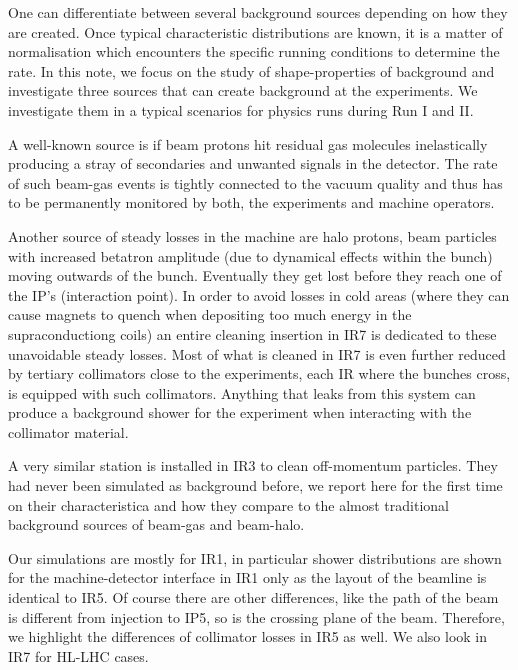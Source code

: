 One can differentiate between several background sources depending on how they are created. Once typical characteristic distributions are known, it is a matter of normalisation which encounters the specific running conditions to determine the rate. In this note, we focus on the study of shape-properties of background and investigate three sources that can create background at the experiments. We investigate them in a typical scenarios for physics runs during Run I and II.

A well-known source is if beam protons hit residual gas molecules inelastically producing a stray of secondaries and unwanted signals in the detector. The rate of such beam-gas events is tightly connected to the vacuum quality and thus has to be permanently monitored by both, the experiments and machine operators.

Another source of steady losses in the machine are halo protons, beam particles with increased betatron amplitude (due to dynamical effects within the bunch) moving outwards of the bunch. Eventually they get lost before they reach one of the IP's (interaction point). In order to avoid losses in cold areas (where they can cause magnets to quench when depositing too much energy in the supraconductiong coils) an entire cleaning insertion in IR7 is dedicated to these unavoidable steady losses. Most of what is cleaned in IR7 is even further reduced by tertiary collimators close to the experiments, each IR where the bunches cross, is equipped with such collimators. Anything that leaks from this system can produce a background shower for the experiment when interacting with the collimator material. 

A very similar station is installed in IR3 to clean off-momentum particles. They had never been simulated as background before, we report here for the first time on their characteristica and how they compare to the almost traditional background sources of beam-gas and beam-halo. 

Our simulations are mostly for IR1, in particular shower distributions are shown for the machine-detector interface in IR1 only as the layout of the beamline is identical to IR5. Of course there are other differences, like the path of the beam is different from injection to IP5, so is the crossing plane of the beam. Therefore, we highlight the differences of collimator losses in IR5 as well. We also look in IR7 for HL-LHC cases.

